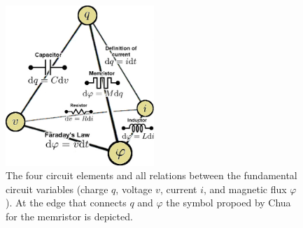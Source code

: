 \begin{center}
  \begin{figure}[h!]
      \begin{center}
        \includegraphics[width=0.5\textwidth]{img/memristor-vars.jpg}
      \end{center}
      \caption{The four circuit elements and all relations between the fundamental circuit variables (charge $q$, voltage $v$, current $i$, and magnetic flux $\varphi$). At the edge that connects $q$ and $\varphi$ the symbol propoed by Chua for the memristor is depicted.}%
      \label{fig:circuit-elements} 
  \end{figure}
\end{center}

